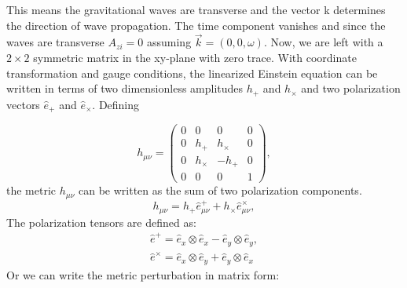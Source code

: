 \documentclass{ttuthes2007}
\begin{document}
This means the gravitational waves are transverse and the vector k
determines the direction of wave propagation. The time component vanishes and
since the waves are transverse $A_{zi}=0$ assuming $\vec{k}=(0,0,\omega)$. Now,
we are left with a $2 \times 2$ symmetric matrix in the xy-plane with zero trace. With coordinate transformation and gauge conditions, the linearized
Einstein equation can be written in terms of two dimensionless amplitudes
$h_+$ and $h_\times$ and two polarization vectors $\hat e_+$ and $\hat
e_\times$. Defining

\begin{equation*}                                                               
h_{\mu\nu}=                                                                  
 \begin{pmatrix}                                                                
    0 & 0 & 0 & 0 \\                                                           
    0 & h_+ & h_\times & 0 \\                                                            
    0 & h_\times & -h_+ & 0 \\                                                            
    0 & 0 & 0 & 1                                                               
 \end{pmatrix},                                                                  
\end{equation*} 
the metric $h_{\mu\nu}$ can be written as the sum of two polarization components.   
\begin{equation}
h_{\mu\nu}=h_+\hat e_{\mu\nu}^+ +h_\times \hat e_{\mu\nu}^\times,
\end{equation}
The polarization tensors are defined as:
\begin{equation}
\begin{aligned}
\hat e^+ = \hat e_x \otimes \hat e_x - \hat e_y \otimes \hat e_y, \\
\hat e^\times = \hat e_x \otimes \hat e_y + \hat e_y \otimes \hat e_x
\end{aligned}
\end{equation}
Or we can write the metric perturbation in matrix form:
\end{document}
